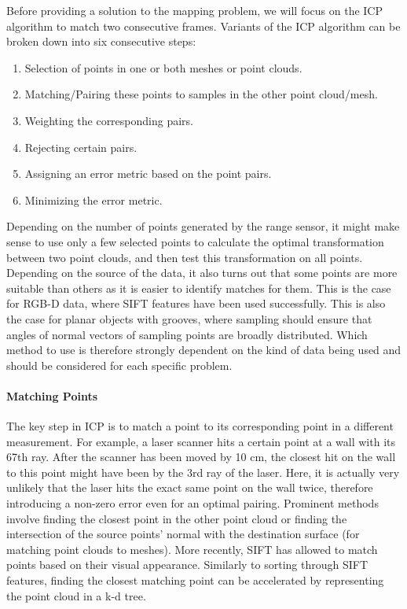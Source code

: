 Before providing a solution to the mapping problem, we will focus on the ICP algorithm to match two consecutive frames. Variants of the ICP algorithm can be broken down into six consecutive steps:
\begin{enumerate}
    \item Selection of points in one or both meshes or point clouds.
    \item Matching/Pairing these points to samples in the other point cloud/mesh.
    \item Weighting the corresponding pairs.
    \item Rejecting certain pairs.
    \item Assigning an error metric based on the point pairs.
    \item Minimizing the error metric.
\end{enumerate}
Depending on the number of points generated by the range sensor, it might make sense to use only a few selected points to calculate the optimal transformation between two point clouds, and then test this transformation on all points. Depending on the source of the data, it also turns out that some points are more suitable than others as it is easier to identify matches for them. This is the case for RGB-D data, where SIFT features have been used successfully. This is also the case for planar objects with grooves, where sampling should ensure that angles of normal vectors of sampling points are broadly distributed. Which method to use is therefore strongly dependent on the kind of data being used and should be considered for each specific problem.

\paragraph{Matching Points}
The key step in ICP is to match a point to its corresponding point in a different measurement. For example, a laser scanner hits a certain point at a wall with its 67th ray. After the scanner has been moved by 10 cm, the closest hit on the wall to this point might have been by the 3rd ray of the laser. Here, it is actually very unlikely that the laser hits the exact same point on the wall twice, therefore introducing a non-zero error even for an optimal pairing. Prominent methods involve finding the closest point in the other point cloud or finding the intersection of the source points' normal with the destination surface (for matching point clouds to meshes). More recently, SIFT has allowed to match points based on their visual appearance. Similarly to sorting through SIFT features, finding the closest matching point can be accelerated by representing the point cloud in a k-d tree.

